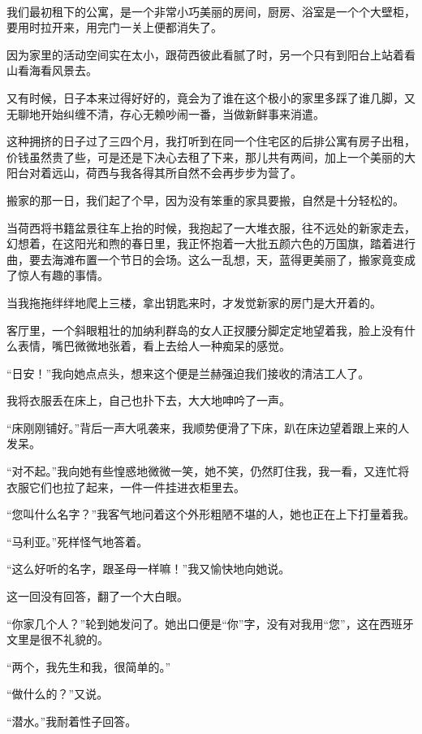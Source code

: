 \par  
\par 我们最初租下的公寓，是一个非常小巧美丽的房间，厨房、浴室是一个个大壁柜，要用时拉开来，用完门一关上便都消失了。
\par 因为家里的活动空间实在太小，跟荷西彼此看腻了时，另一个只有到阳台上站着看山看海看风景去。
\par 又有时候，日子本来过得好好的，竟会为了谁在这个极小的家里多踩了谁几脚，又无聊地开始纠缠不清，存心无赖吵闹一番，当做新鲜事来消遣。
\par 这种拥挤的日子过了三四个月，我打听到在同一个住宅区的后排公寓有房子出租，价钱虽然贵了些，可是还是下决心去租了下来，那儿共有两间，加上一个美丽的大阳台对着远山，荷西与我各得其所自然不会再步步为营了。
\par 搬家的那一日，我们起了个早，因为没有笨重的家具要搬，自然是十分轻松的。
\par 当荷西将书籍盆景往车上抬的时候，我抱起了一大堆衣服，往不远处的新家走去，幻想着，在这阳光和煦的春日里，我正怀抱着一大批五颜六色的万国旗，踏着进行曲，要去海滩布置一个节日的会场。这么一乱想，天，蓝得更美丽了，搬家竟变成了惊人有趣的事情。
\par 当我拖拖绊绊地爬上三楼，拿出钥匙来时，才发觉新家的房门是大开着的。
\par 客厅里，一个斜眼粗壮的加纳利群岛的女人正扠腰分脚定定地望着我，脸上没有什么表情，嘴巴微微地张着，看上去给人一种痴呆的感觉。
\par “日安！”我向她点点头，想来这个便是兰赫强迫我们接收的清洁工人了。
\par 我将衣服丢在床上，自己也扑下去，大大地呻吟了一声。
\par “床刚刚铺好。”背后一声大吼袭来，我顺势便滑了下床，趴在床边望着跟上来的人发呆。
\par “对不起。”我向她有些惶惑地微微一笑，她不笑，仍然盯住我，我一看，又连忙将衣服它们也拉了起来，一件一件挂进衣柜里去。
\par “您叫什么名字？”我客气地问着这个外形粗陋不堪的人，她也正在上下打量着我。
\par “马利亚。”死样怪气地答着。
\par “这么好听的名字，跟圣母一样嘛！”我又愉快地向她说。
\par 这一回没有回答，翻了一个大白眼。
\par “你家几个人？”轮到她发问了。她出口便是“你”字，没有对我用“您”，这在西班牙文里是很不礼貌的。
\par “两个，我先生和我，很简单的。”
\par “做什么的？”又说。
\par “潜水。”我耐着性子回答。
